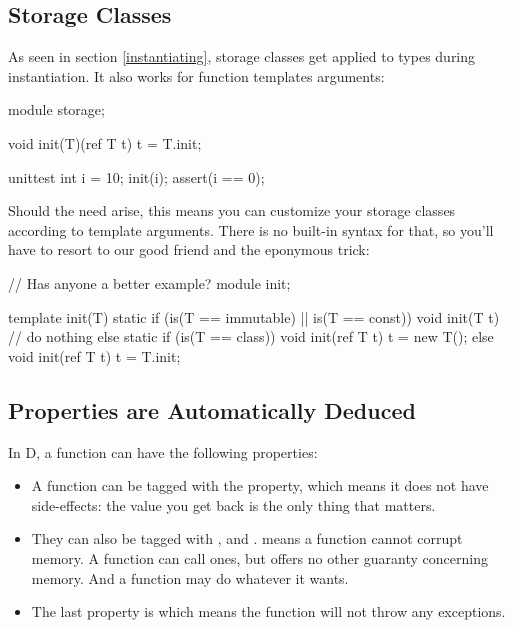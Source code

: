 
\subsection{Storage Classes}\label{storageclasses}

As seen in section \ref{instantiating}, storage classes get applied to types during instantiation. It also works for function templates arguments:

\begin{dcode}
module storage;

void init(T)(ref T t)
{ 
    t = T.init;
}

unittest
{
    int i = 10;
    init(i);
    assert(i == 0);
}
\end{dcode}

Should the need arise, this means you can customize your storage classes according to template arguments. There is no built-in syntax for that, so you'll have to resort to our good friend  and the eponymous trick:

\begin{dcode}
// Has anyone a better example?
module init;

template init(T)
{
    static if (is(T == immutable) || is(T == const))
        void init(T t) {} // do nothing
    else static if (is(T == class))
        void init(ref T t)
        {
            t = new T();
        }
    else 
        void init(ref T t)
        {
            t = T.init;
        }
}
\end{dcode}

\subsection{Properties are Automatically Deduced}\label{autodeduce}

In D, a function can have the following properties:

\begin{itemize}
\item A function can be tagged with the  property, which means it does not have side-effects: the value you get back is the only thing that matters. 
\item They can also be tagged with ,  and .  means a function cannot corrupt memory. A  function can call  ones, but offers no other guaranty concerning memory. And a  function may do whatever it wants.
\item The last property is  which means the function will not throw any exceptions.
\end{itemize}

